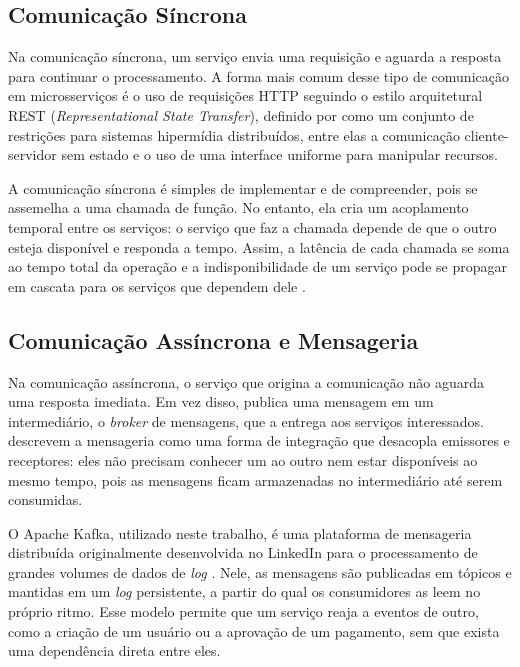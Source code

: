\subsection{Comunicação Síncrona}

Na comunicação síncrona, um serviço envia uma requisição e aguarda a resposta para continuar o
processamento. A forma mais comum desse tipo de comunicação em microsserviços é o uso de
requisições HTTP seguindo o estilo arquitetural REST (\textit{Representational State
Transfer}), definido por  como um conjunto de restrições para sistemas
hipermídia distribuídos, entre elas a comunicação cliente-servidor sem estado e o uso de uma
interface uniforme para manipular recursos.

A comunicação síncrona é simples de implementar e de compreender, pois se assemelha a uma
chamada de função. No entanto, ela cria um acoplamento temporal entre os serviços: o serviço
que faz a chamada depende de que o outro esteja disponível e responda a tempo. Assim, a
latência de cada chamada se soma ao tempo total da operação e a indisponibilidade de um
serviço pode se propagar em cascata para os serviços que dependem dele
\cite{newman2021, richardson2018}.

\subsection{Comunicação Assíncrona e Mensageria}

Na comunicação assíncrona, o serviço que origina a comunicação não aguarda uma resposta
imediata. Em vez disso, publica uma mensagem em um intermediário, o \textit{broker} de
mensagens, que a entrega aos serviços interessados.  descrevem a
mensageria como uma forma de integração que desacopla emissores e receptores: eles não
precisam conhecer um ao outro nem estar disponíveis ao mesmo tempo, pois as mensagens ficam
armazenadas no intermediário até serem consumidas.

O Apache Kafka, utilizado neste trabalho, é uma plataforma de mensageria distribuída
originalmente desenvolvida no LinkedIn para o processamento de grandes volumes de dados de
\textit{log} \cite{kreps2011}. Nele, as mensagens são publicadas em tópicos e mantidas em um
\textit{log} persistente, a partir do qual os consumidores as leem no próprio ritmo. Esse
modelo permite que um serviço reaja a eventos de outro, como a criação de um usuário ou a
aprovação de um pagamento, sem que exista uma dependência direta entre eles.


